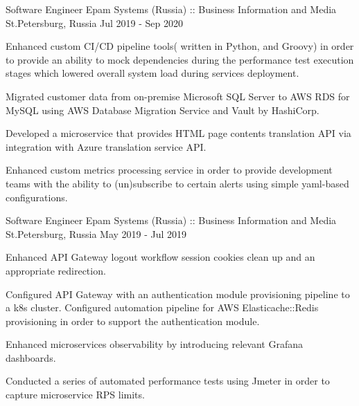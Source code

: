 \begin{cventries}
\cventry
{Software Engineer} %
{Epam Systems (Russia) :: Business Information and Media} %
{St.Petersburg, Russia} %
{Jul 2019 - Sep 2020} %
{
  \begin{cvitems} %
    \item { Enhanced custom CI/CD pipeline tools( written in Python, and Groovy) 
    in order to provide an ability to mock dependencies during the performance test execution stages
     which lowered overall system load during services deployment.}
    \item {Migrated customer data from on-premise Microsoft SQL Server to AWS RDS for MySQL using AWS Database Migration Service and Vault by HashiCorp.}
    \item {Developed a microservice that provides HTML page contents translation API via integration with Azure translation service API.}
    \item {Enhanced custom metrics processing service in order to provide development teams with the ability to (un)subscribe to certain alerts using simple yaml-based configurations.}
  \end{cvitems}
}

\cventry
{Software Engineer} %
{Epam Systems (Russia) :: Business Information and Media} %
{St.Petersburg, Russia} %
{May 2019 - Jul 2019} %
{
  \begin{cvitems} %
    \item {Enhanced API Gateway logout workflow session cookies clean up and an appropriate redirection.}
    \item {Configured API Gateway with an authentication module provisioning pipeline to a k8s cluster. 
    Configured automation pipeline for AWS Elasticache::Redis provisioning in order to support the authentication module.}
    \item {Enhanced microservices observability by introducing relevant Grafana dashboards.}
    \item {Conducted a series of automated performance tests using Jmeter in order to capture microservice RPS limits.}
  \end{cvitems}
}


\end{cventries}
